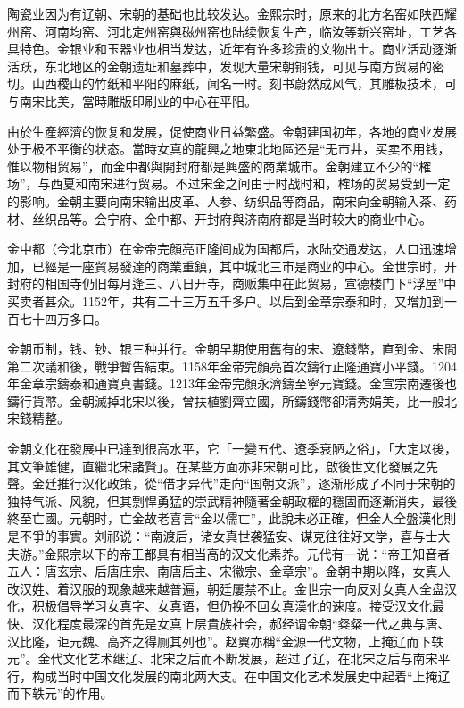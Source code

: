 陶瓷业因为有辽朝、宋朝的基础也比较发达。金熙宗时，原来的北方名窑如陕西耀州窑、河南均窑、河北定州窑與磁州窑也陆续恢复生产，临汝等新兴窑址，工艺各具特色。金银业和玉器业也相当发达，近年有许多珍贵的文物出土。商业活动逐渐活跃，东北地区的金朝遗址和墓葬中，发现大量宋朝铜钱，可见与南方贸易的密切。山西稷山的竹纸和平阳的麻纸，闻名一时。刻书蔚然成风气，其雕板技术，可与南宋比美，當時雕版印刷业的中心在平阳。

由於生產經濟的恢复和发展，促使商业日益繁盛。金朝建国初年，各地的商业发展处于极不平衡的状态。當時女真的龍興之地東北地區还是“无市井，买卖不用钱，惟以物相贸易”，而金中都與開封府都是興盛的商業城市。金朝建立不少的“榷场”，与西夏和南宋进行贸易。不过宋金之间由于时战时和，榷场的贸易受到一定的影响。金朝主要向南宋输出皮革、人参、纺织品等商品，南宋向金朝输入茶、药材、丝织品等。会宁府、金中都、开封府與济南府都是当时较大的商业中心。

金中都（今北京市）在金帝完顏亮正隆间成为国都后，水陆交通发达，人口迅速增加，已經是一座貿易發達的商業重鎮，其中城北三市是商业的中心。金世宗时，开封府的相国寺仍旧每月逢三、八日开寺，商贩集中在此贸易，宣德楼门下“浮屋”中买卖者甚众。1152年，共有二十三万五千多户。以后到金章宗泰和时，又增加到一百七十四万多口。

金朝币制，钱、钞、银三种并行。金朝早期使用舊有的宋、遼錢幣，直到金、宋間第二次議和後，戰爭暫告結束。1158年金帝完顏亮首次鑄行正隆通寶小平錢。1204年金章宗鑄泰和通寶真書錢。1213年金帝完顏永濟鑄至寧元寶錢。金宣宗南遷後也鑄行貨幣。金朝滅掉北宋以後，曾扶植劉齊立國，所鑄錢幣卻清秀娟美，比一般北宋錢精整。

金朝文化在發展中已達到很高水平，它「一變五代、遼季衰陋之俗」，「大定以後，其文筆雄健，直繼北宋諸賢」。在某些方面亦非宋朝可比，啟後世文化發展之先聲。金廷推行汉化政策，從“借才异代”走向“国朝文派”，逐渐形成了不同于宋朝的独特气派、风貌，但其剽悍勇猛的崇武精神隨著金朝政權的穩固而逐漸消失，最後終至亡國。元朝时，亡金故老喜言“金以儒亡”，此說未必正確，但金人全盤漢化則是不爭的事實。刘祁说：“南渡后，诸女真世袭猛安、谋克往往好文学，喜与士大夫游。”金熙宗以下的帝王都具有相当高的汉文化素养。元代有一说：“帝王知音者五人：唐玄宗、后唐庄宗、南唐后主、宋徽宗、金章宗”。金朝中期以降，女真人改汉姓、着汉服的现象越来越普遍，朝廷屢禁不止。金世宗一向反对女真人全盘汉化，积极倡导学习女真字、女真语，但仍挽不回女真漢化的速度。接受汉文化最快、汉化程度最深的首先是女真上层貴族社会，郝经谓金朝“粲粲一代之典与唐、汉比隆，讵元魏、高齐之得厕其列也”。赵翼亦稱“金源一代文物，上掩辽而下轶元”。金代文化艺术继辽、北宋之后而不断发展，超过了辽，在北宋之后与南宋平行，构成当时中国文化发展的南北两大支。在中国文化艺术发展史中起着“上掩辽而下轶元”的作用。

